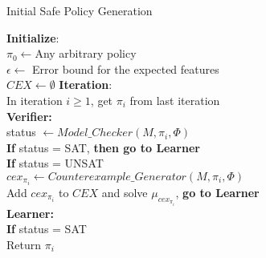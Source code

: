 \begin{algorithm}[htb]
\caption{Initial Safe Policy Generation}
\begin{algorithmic}[1]
\State \textbf{Initialize}: 
\\\qquad$\pi_0\gets$Any arbitrary policy    
\\\qquad$\epsilon\gets$ Error bound for the expected features
\\\qquad$CEX\gets\emptyset$
\State \textbf{Iteration}: 
\\\qquad In iteration $i\geq1$, get $\pi_i$ from last iteration
\\\qquad\textbf{Verifier:}
\\\qquad\qquad status $\gets Model\_Checker(M,\pi_i, \Phi)$
\\\qquad\qquad \textbf{If} status = SAT, \textbf{then go to Learner}
\\\qquad\qquad \textbf{If} status = UNSAT
\\\qquad\qquad\qquad $cex_{\pi_i}\gets Counterexample\_Generator(M,\pi_i,\Phi)$
\\\qquad\qquad\qquad Add $cex_{\pi_i}$ to $CEX$ and solve $\mu_{cex_{\pi_i}}$, \textbf{go to Learner} 
\\\qquad\textbf{Learner:}
\\\qquad\qquad \textbf{If} status = SAT
\\\qquad\qquad\qquad Return $\pi_i$

\end{algorithmic}
\end{algorithm}
